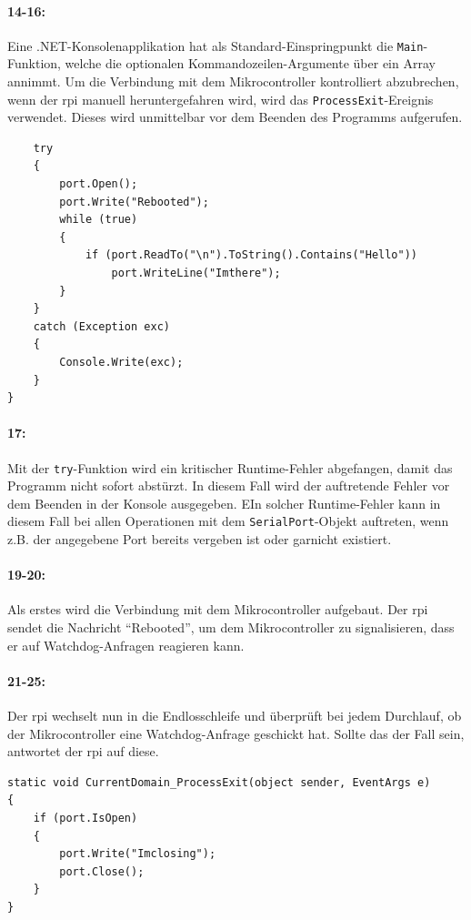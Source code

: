 \paragraph{14-16:}
Eine .NET-Konsolenapplikation hat als Standard-Einspringpunkt die \texttt{Main}-Funktion, welche die optionalen Kommandozeilen-Argumente über ein Array annimmt.
Um die Verbindung mit dem Mikrocontroller kontrolliert abzubrechen, wenn der \ac{rpi} manuell heruntergefahren wird, wird das \texttt{ProcessExit}-Ereignis verwendet.
Dieses wird unmittelbar vor dem Beenden des Programms aufgerufen.

\begin{verbatim}
    try
    {
        port.Open();
        port.Write("Rebooted");
        while (true)
        {
            if (port.ReadTo("\n").ToString().Contains("Hello"))
                port.WriteLine("Imthere");
        }
    }
    catch (Exception exc)
    {
        Console.Write(exc);
    }
}
\end{verbatim}

\paragraph{17:}
Mit der \texttt{try}-Funktion wird ein kritischer Runtime-Fehler abgefangen, damit das Programm nicht sofort abstürzt.
In diesem Fall wird der auftretende Fehler vor dem Beenden in der Konsole ausgegeben.
EIn solcher Runtime-Fehler kann in diesem Fall bei allen Operationen mit dem \texttt{SerialPort}-Objekt auftreten, wenn z.B. der angegebene Port bereits vergeben ist oder garnicht existiert.

\paragraph{19-20:}
Als erstes wird die Verbindung mit dem Mikrocontroller aufgebaut.
Der \ac{rpi} sendet die Nachricht \enquote{Rebooted}, um dem Mikrocontroller zu signalisieren, dass er auf Watchdog-Anfragen reagieren kann.

\paragraph{21-25:}
Der \ac{rpi} wechselt nun in die Endlosschleife und überprüft bei jedem Durchlauf, ob der Mikrocontroller eine Watchdog-Anfrage geschickt hat.
Sollte das der Fall sein, antwortet der \ac{rpi} auf diese.

\begin{verbatim}
static void CurrentDomain_ProcessExit(object sender, EventArgs e)
{
    if (port.IsOpen)
    {
        port.Write("Imclosing");
        port.Close();
    }
}
\end{verbatim}

